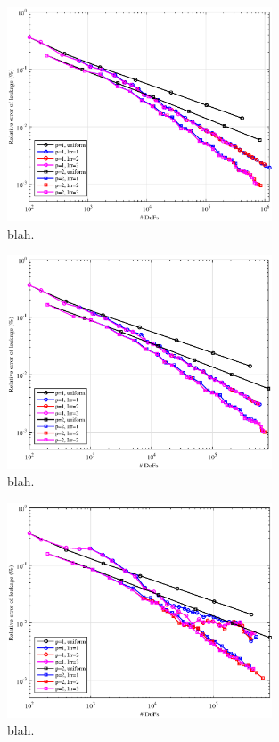 \begin{figure}
\centering
\includegraphics[width=0.70\textwidth]{figures/sec_BF/SL_PWL_Err.eps}
\caption{blah.}
\label{fig::BF_Results_SL_PWL_err}
\end{figure}

\begin{figure}
\centering
\includegraphics[width=0.70\textwidth]{figures/sec_BF/SL_MV_Err.eps}
\caption{blah.}
\label{fig::BF_Results_SL_MV_err}
\end{figure}

\begin{figure}
\centering
\includegraphics[width=0.70\textwidth]{figures/sec_BF/SL_MAXENT_Err.eps}
\caption{blah.}
\label{fig::BF_Results_SL_MAXENT_err}
\end{figure}

